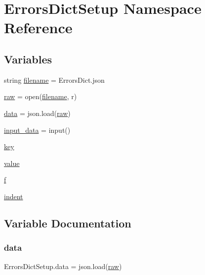 \hypertarget{namespace_errors_dict_setup}{}\section{Errors\+Dict\+Setup Namespace Reference}
\label{namespace_errors_dict_setup}
\subsection*{Variables}
\begin{DoxyCompactItemize}
\item 
string \mbox{\hyperlink{namespace_errors_dict_setup_a0c97c48fca0fdec3e730b9df1dbab9c7}{filename}} = \textquotesingle{}Errors\+Dict.\+json\textquotesingle{}
\item 
\mbox{\hyperlink{namespace_errors_dict_setup_a71f324cc110ab41d2a588f590fff7481}{raw}} = open(\mbox{\hyperlink{namespace_errors_dict_setup_a0c97c48fca0fdec3e730b9df1dbab9c7}{filename}}, \textquotesingle{}r\textquotesingle{})
\item 
\mbox{\hyperlink{namespace_errors_dict_setup_af570460846fb9f0c91abd308a095dcdc}{data}} = json.\+load(\mbox{\hyperlink{namespace_errors_dict_setup_a71f324cc110ab41d2a588f590fff7481}{raw}})
\item 
\mbox{\hyperlink{namespace_errors_dict_setup_a82a4de99ebada6605cb7ca0598ef411e}{input\+\_\+data}} = input()
\item 
\mbox{\hyperlink{namespace_errors_dict_setup_a09c268098d09ffb8e5504f30fa6d5dd9}{key}}
\item 
\mbox{\hyperlink{namespace_errors_dict_setup_a4436d6af623cbe45d37493afe4de9461}{value}}
\item 
\mbox{\hyperlink{namespace_errors_dict_setup_aadfab4e19ca2acd086062511d8ec75a8}{f}}
\item 
\mbox{\hyperlink{namespace_errors_dict_setup_a3c8f88b66a58f9c28e5d3bd66fa6191a}{indent}}
\end{DoxyCompactItemize}


\subsection{Variable Documentation}
\mbox{\label{namespace_errors_dict_setup_af570460846fb9f0c91abd308a095dcdc}} 
\subsubsection{\texorpdfstring{data}{data}}
{\footnotesize\ttfamily Errors\+Dict\+Setup.\+data = json.\+load(\mbox{\hyperlink{namespace_errors_dict_setup_a71f324cc110ab41d2a588f590fff7481}{raw}})}




